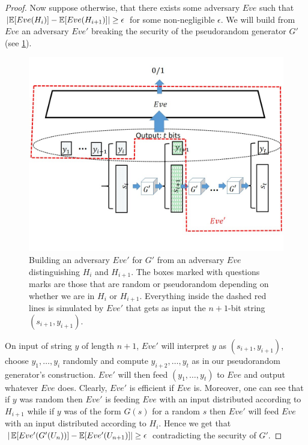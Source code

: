 \begin{proof}
Now suppose otherwise, that there exists some adversary \(Eve\) such
that \(\left| \operatorname*{\mathbb E}[Eve(H_i)] - \operatorname*{\mathbb E}[Eve(H_{i+1})] \right| \geq \epsilon\)
for some non-negligible \(\epsilon\). We will build from \(Eve\) an
adversary \(Eve'\) breaking the security of the pseudorandom generator
\(G'\) (see \cref{reductionlengthextendfig}).

\begin{figure}
\centering
\includegraphics[width=\textwidth, height=0.25\paperheight, keepaspectratio]{../figure/length-extension-prg-adversary.jpg}
\caption{Building an adversary \(Eve'\) for \(G'\) from an adversary
\(Eve\) distinguishing \(H_i\) and \(H_{i+1}\). The boxes marked with
questions marks are those that are random or pseudorandom depending on
whether we are in \(H_i\) or \(H_{i+1}\). Everything inside the dashed
red lines is simulated by \(Eve'\) that gets as input the \(n+1\)-bit
string \((s_{i+1},y_{i+1})\).}
\label{reductionlengthextendfig}
\end{figure}

On input of string \(y\) of length \(n+1\), \(Eve'\) will interpret
\(y\) as \((s_{i+1},y_{i+1})\), choose \(y_1,\ldots,y_i\) randomly and
compute \(y_{i+2},\ldots,y_t\) as in our pseudorandom generator's
construction. \(Eve'\) will then feed \((y_1,\ldots,y_t)\) to \(Eve\)
and output whatever \(Eve\) does. Clearly, \(Eve'\) is efficient if
\(Eve\) is. Moreover, one can see that if \(y\) was random then \(Eve'\)
is feeding \(Eve\) with an input distributed according to \(H_{i+1}\)
while if \(y\) was of the form \(G(s)\) for a random \(s\) then \(Eve'\)
will feed \(Eve\) with an input distributed according to \(H_i\). Hence
we get that \(| \operatorname*{\mathbb E}[ Eve'(G'(U_n))] - \operatorname*{\mathbb E}[Eve'(U_{n+1})] | \geq \epsilon\)
contradicting the security of \(G'\).

\end{proof}

